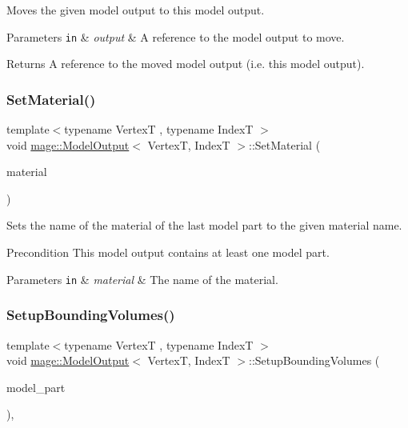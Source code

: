 Moves the given model output to this model output.


\begin{DoxyParams}[1]{Parameters}
\mbox{\tt in}  & {\em output} & A reference to the model output to move. \\
\hline
\end{DoxyParams}
\begin{DoxyReturn}{Returns}
A reference to the moved model output (i.\+e. this model output). 
\end{DoxyReturn}
\hypertarget{structmage_1_1_model_output_a88f2dff99e178b84637ae945ba5f6f53}{}\label{structmage_1_1_model_output_a88f2dff99e178b84637ae945ba5f6f53} 
\subsubsection{\texorpdfstring{Set\+Material()}{SetMaterial()}}
{\footnotesize\ttfamily template$<$typename VertexT , typename IndexT $>$ \\
void \hyperlink{structmage_1_1_model_output}{mage\+::\+Model\+Output}$<$ VertexT, IndexT $>$\+::Set\+Material (\begin{DoxyParamCaption}\item[{string}]{material }\end{DoxyParamCaption})}

Sets the name of the material of the last model part to the given material name.

\begin{DoxyPrecond}{Precondition}
This model output contains at least one model part. 
\end{DoxyPrecond}

\begin{DoxyParams}[1]{Parameters}
\mbox{\tt in}  & {\em material} & The name of the material. \\
\hline
\end{DoxyParams}
\hypertarget{structmage_1_1_model_output_acecfa6de92e27b435ef15cc02640e992}{}\label{structmage_1_1_model_output_acecfa6de92e27b435ef15cc02640e992} 
\subsubsection{\texorpdfstring{Setup\+Bounding\+Volumes()}{SetupBoundingVolumes()}}
{\footnotesize\ttfamily template$<$typename VertexT , typename IndexT $>$ \\
void \hyperlink{structmage_1_1_model_output}{mage\+::\+Model\+Output}$<$ VertexT, IndexT $>$\+::Setup\+Bounding\+Volumes (\begin{DoxyParamCaption}\item[{\hyperlink{structmage_1_1_model_part}{Model\+Part} \&}]{model\+\_\+part }\end{DoxyParamCaption})\hspace{0.3cm}{\ttfamily [private]}, {\ttfamily [noexcept]}}


